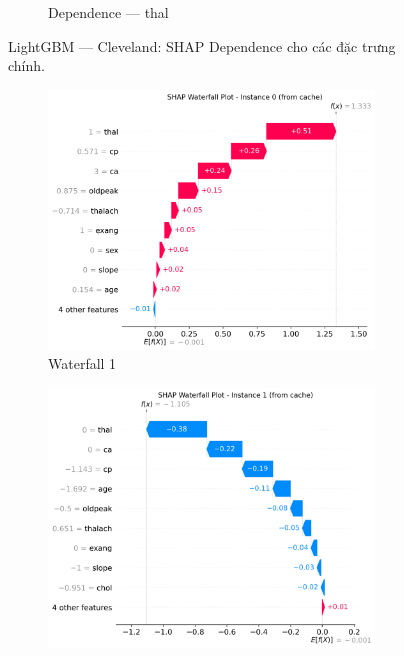 \begin{figure}[H]
\begin{subfigure}[b]{0.31\textwidth}
\caption{Dependence — thal}
\label{fig:lgbm_clev_dep_thal}
\end{subfigure}
\caption{LightGBM — Cleveland: SHAP Dependence cho các đặc trưng chính.}
\label{fig:lgbm_clev_dependences}
\end{figure}

\begin{figure}[H]
\centering
\begin{subfigure}[b]{0.31\textwidth}
\centering
\includegraphics[width=0.95\textwidth]{Result/cleveland_dataset/LightGBM/SHAP/Waterfall 1.png}
\caption{Waterfall 1}
\label{fig:lgbm_clev_waterfall1}
\end{subfigure}\hfill
\begin{subfigure}[b]{0.31\textwidth}
\centering
\includegraphics[width=0.95\textwidth]{Result/cleveland_dataset/LightGBM/SHAP/Waterfall 2.png}

\end{subfigure}
\end{figure}
